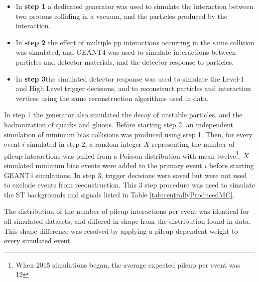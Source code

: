 \begin{itemize}
	\item In \textbf{step 1} a dedicated \MC generator was used to simulate the interaction between two protons 
		colliding in a vacuum, and the particles produced by the interaction.
	\item In \textbf{step 2} the effect of multiple pp interactions occurring in the same collision was simulated, 
		and GEANT4 \cite{geant4} was used to simulate interactions between particles and detector materials, 
		and the detector response to particles.
	\item In \textbf{step 3}the simulated detector response was used to simulate the Level-1 and High Level 
		trigger decisions, and to reconstruct particles and interaction vertices using the same reconstruction 
		algorithms used in data.
\end{itemize}

In step 1 the \MC generator also simulated the decay of unstable particles, and the hadronization of quarks and gluons.  
Before starting step 2, an independent \MC simulation of minimum bias collisions was produced using step 1.  
Then, for every event $i$ simulated in step 2, a random integer $X$ representing the number of pileup interactions 
was pulled from a Poisson distribution with mean twelve\footnote{When 2015 \MC simulations began, the average expected 
pileup per event was 12}.  $X$ simulated minimum bias events were added to the primary event $i$ before starting GEANT4 
simulations.  In step 3, trigger decisions were saved but were not used to exclude events from reconstruction.  This 
3 step procedure was used to simulate the ST backgrounds and \WR signals listed in Table \ref{tab:centrallyProducedMC}.

The distribution of the number of pileup interactions per event was identical for all simulated datasets, and 
differed in shape from the distribution found in data.  This shape difference was resolved by applying a pileup 
dependent weight to every simulated event.

